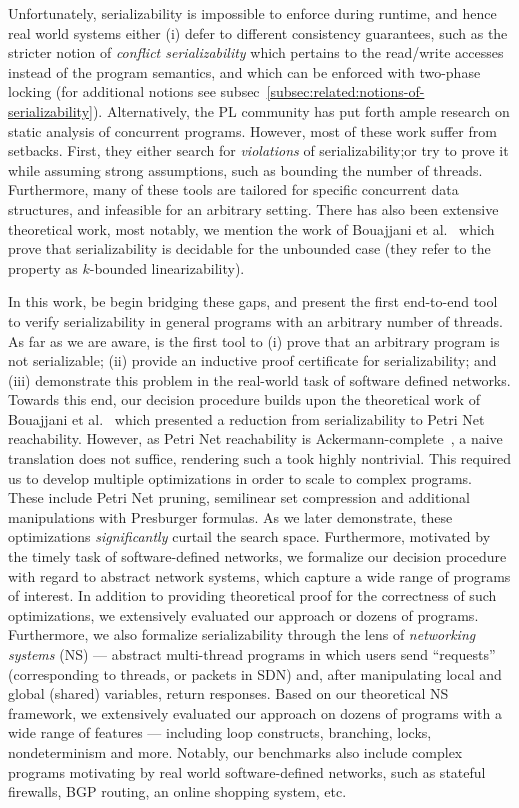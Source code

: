 Unfortunately, serializability is impossible to enforce during runtime, and hence real world systems either (i) defer to different consistency guarantees, such as the stricter notion of \textit{conflict serializability} which pertains to the read/write accesses instead of the program semantics, and which can be enforced with two-phase locking (for additional notions see subsec~\ref{subsec:related:notions-of-serializability}). Alternatively, the PL community has put forth ample research on static analysis of concurrent programs. However, most of these work suffer from setbacks. First, they either search for \textit{violations} of serializability;or try to prove it while assuming strong assumptions, such as bounding the number of threads.
Furthermore, many of these tools are tailored for specific concurrent data structures, and infeasible for an arbitrary setting.
%
There has also been extensive theoretical work, most notably, we mention the work of Bouajjani et al.~\cite{BoEmEnHa13} which prove that serializability is decidable for the unbounded case (they refer to the property as $k$-bounded linearizability).


In this work, be begin bridging these gaps, and present the first end-to-end tool to verify serializability in general programs with an arbitrary number of threads. 
As far as we are aware, is the first tool to (i) prove that an arbitrary program is not serializable; (ii) provide an inductive proof certificate for serializability; and (iii) demonstrate this problem in the real-world task of software defined networks.
%
Towards this end, our decision procedure builds upon the theoretical work of Bouajjani et al.~\cite{BoEmEnHa13} which presented a reduction from serializability to Petri Net reachability.  However, as Petri Net reachability is Ackermann-complete~\cite{CzWo22}, a naive translation does not suffice, rendering such a took  highly nontrivial. This required us to develop multiple optimizations in order to scale to complex programs. 
These include Petri Net pruning, semilinear set compression and additional manipulations with Presburger formulas.
As we later demonstrate, these optimizations \textit{significantly} curtail the search space.
Furthermore, motivated by the timely task of software-defined networks, we formalize our decision procedure with regard to abstract network systems, which capture a wide range of programs of interest. 
In addition to providing theoretical proof for the correctness of such optimizations, we extensively evaluated our approach or dozens of programs.
Furthermore, we also formalize serializability through the lens of \textit{networking systems} (NS) --- abstract multi-thread programs in which users send ``requests'' (corresponding to threads, or packets in SDN) and, after manipulating local and global (shared) variables, return responses.
Based on our theoretical NS framework, we extensively evaluated our approach on dozens of programs with a wide range of features --- including loop constructs, branching, locks, nondeterminism and more. Notably, our benchmarks also include complex programs motivating by real world software-defined networks, such as stateful firewalls, BGP routing, an online shopping system, etc.
  

